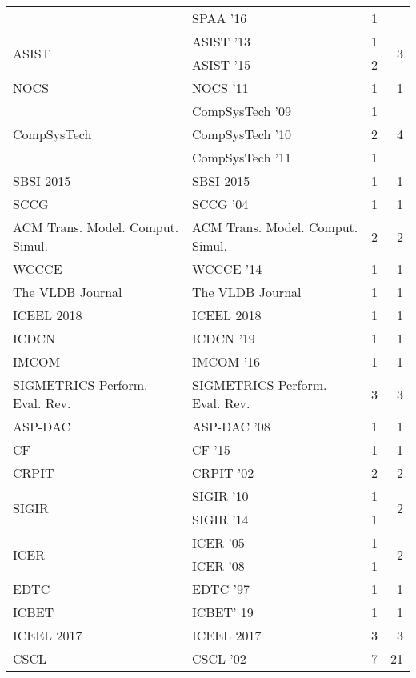 \begin{table*}[t]
\begin{tabular}{llrr}
& SPAA '16 & 1 &\\
\multirow{2}{*}{ASIST } & ASIST '13 & 1 & \multirow{2}{*}{3}\\
& ASIST '15 & 2 &\\
\multirow{1}{*}{NOCS } & NOCS '11 & 1 & \multirow{1}{*}{1}\\
\multirow{3}{*}{CompSysTech } & CompSysTech '09 & 1 & \multirow{3}{*}{4}\\
& CompSysTech '10 & 2 &\\
& CompSysTech '11 & 1 &\\
\multirow{1}{*}{SBSI 2015} & SBSI 2015 & 1 & \multirow{1}{*}{1}\\
\multirow{1}{*}{SCCG } & SCCG '04 & 1 & \multirow{1}{*}{1}\\
\multirow{1}{*}{ACM Trans. Model. Comput. Simul.} & ACM Trans. Model. Comput. Simul. & 2 & \multirow{1}{*}{2}\\
\multirow{1}{*}{WCCCE } & WCCCE '14 & 1 & \multirow{1}{*}{1}\\
\multirow{1}{*}{The VLDB Journal} & The VLDB Journal & 1 & \multirow{1}{*}{1}\\
\multirow{1}{*}{ICEEL 2018} & ICEEL 2018 & 1 & \multirow{1}{*}{1}\\
\multirow{1}{*}{ICDCN } & ICDCN '19 & 1 & \multirow{1}{*}{1}\\
\multirow{1}{*}{IMCOM } & IMCOM '16 & 1 & \multirow{1}{*}{1}\\
\multirow{1}{*}{SIGMETRICS Perform. Eval. Rev.} & SIGMETRICS Perform. Eval. Rev. & 3 & \multirow{1}{*}{3}\\
\multirow{1}{*}{ASP-DAC } & ASP-DAC '08 & 1 & \multirow{1}{*}{1}\\
\multirow{1}{*}{CF } & CF '15 & 1 & \multirow{1}{*}{1}\\
\multirow{1}{*}{CRPIT } & CRPIT '02 & 2 & \multirow{1}{*}{2}\\
\multirow{2}{*}{SIGIR } & SIGIR '10 & 1 & \multirow{2}{*}{2}\\
& SIGIR '14 & 1 &\\
\multirow{2}{*}{ICER } & ICER '05 & 1 & \multirow{2}{*}{2}\\
& ICER '08 & 1 &\\
\multirow{1}{*}{EDTC } & EDTC '97 & 1 & \multirow{1}{*}{1}\\
\multirow{1}{*}{ICBET} & ICBET' 19 & 1 & \multirow{1}{*}{1}\\
\multirow{1}{*}{ICEEL 2017} & ICEEL 2017 & 3 & \multirow{1}{*}{3}\\
\multirow{4}{*}{CSCL } & CSCL '02 & 7 & \multirow{4}{*}{21}\\

\end{tabular}
\end{table*}
